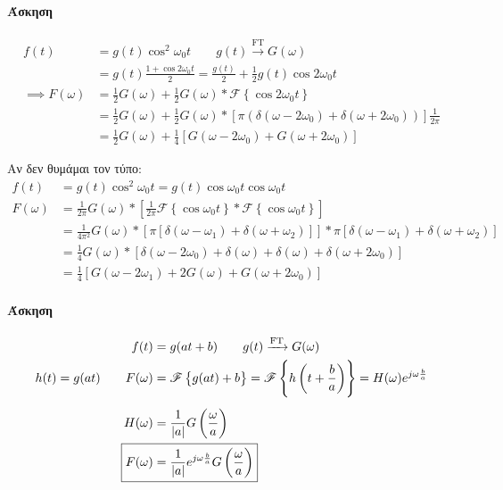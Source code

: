      \paragraph{Άσκηση}
     \begin{align*}
     f(t) &= g(t) \cos^2 \omega_0 t \qquad g(t) \xrightarrow{\text{FT}} G(\omega )
     \\ &= g(t)\frac{1+\cos2\omega_0 t}{2} = \frac{g(t)}{2} + 
     \frac{1}{2}g(t)\cos2\omega_0 t \\
     \implies F(\omega ) &= \frac{1}{2}G(\omega )+\frac{1}{2}G(\omega )
     *\mathscr F\left\lbrace \cos2\omega_0 t \right\rbrace
     \\ &= \frac{1}{2}G(\omega )+\frac{1}{2}G(\omega ) *
     \left[ \pi\left(\delta(\omega-2\omega_0)+\delta(\omega+2\omega_0)\right) \right]
     \frac{1}{2\pi} \\ &= \frac{1}{2}G(\omega ) + \frac{1}{4} \left[
     G(\omega -2\omega_0)+G(\omega +2\omega_0)
     \right]
     \end{align*}
     
     Αν δεν θυμάμαι τον τύπο:
     \begin{align*}
     f(t) &= g(t)\cos^2\omega_0 t = g(t)\cos\omega_0 t\cos\omega_0 t \\
     F(\omega ) &= \frac{1}{2\pi}G(\omega)*\left[
     \frac{1}{2\pi}\mathscr F\left\lbrace \cos\omega_0t \right\rbrace
     *\mathscr F \left\lbrace \cos\omega_0 t \right\rbrace
     \right] \\ &= \frac{1}{4\pi^2} G(\omega ) * \left[
     \pi\left[ \delta(\omega -\omega_1)+\delta(\omega+\omega_2) \right]
     \right] * \pi\left[
     \delta(\omega-\omega_1)+\delta(\omega+\omega_2)
     \right] \\ &=
     \frac{1}{4}G(\omega ) * \left[
     \delta(\omega -2\omega_0)+\delta(\omega)+\delta(\omega)+\delta(\omega+2\omega_0)
     \right]
     \\ &= \frac{1}{4}\left[
     G(\omega -2\omega_1)+2G(\omega )+G(\omega +2\omega_0)
     \right]
     \end{align*}
     
     \paragraph{Άσκηση}
     \begin{align*}
     f(t) &= g(at+b) \qquad g(t)\xrightarrow{\text{FT}}G(\omega ) \\
     h(t)=g(at) \qquad
     F(\omega ) &= \mathscr F\left\lbrace g(at)+b \right\rbrace
     = \mathscr F \left\lbrace h\left(t+\frac{b}{a}\right) \right\rbrace
     = H(\omega )e^{j\omega \frac{b}{a}} \\[5pt]
     H(\omega ) &= \frac{1}{|a|}G\left(\frac{\omega}{a}\right) \\
     \Aboxed{F(\omega ) &=
     \frac{1}{|a|}e^{j\omega\frac{b}{a}}G\left(\frac{\omega}{a}\right)}
     \end{align*}
     
